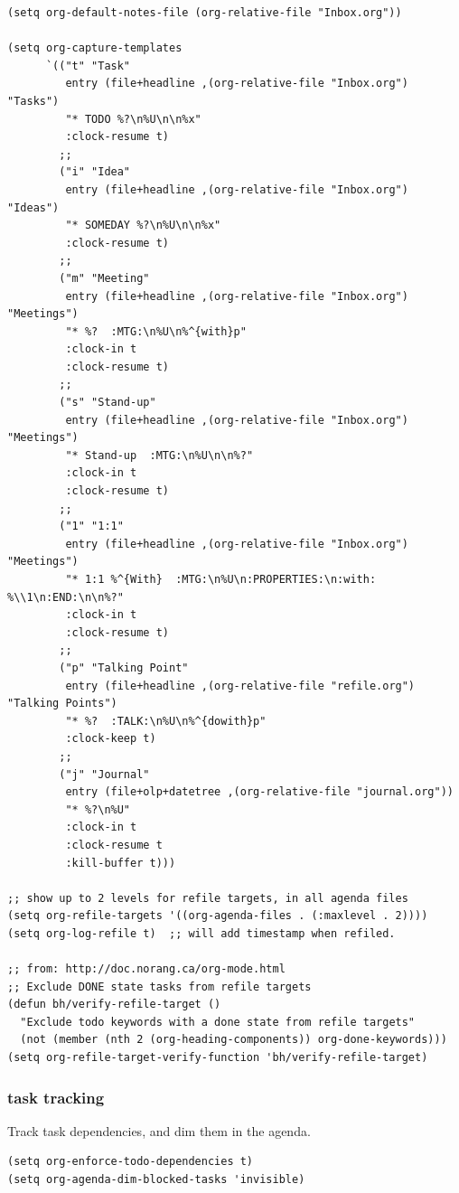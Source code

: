 \documentclass[11pt]{article}
\begin{document}
\begin{verbatim}
(setq org-default-notes-file (org-relative-file "Inbox.org"))

(setq org-capture-templates
      `(("t" "Task"
         entry (file+headline ,(org-relative-file "Inbox.org") "Tasks")
         "* TODO %?\n%U\n\n%x"
         :clock-resume t)
        ;;
        ("i" "Idea"
         entry (file+headline ,(org-relative-file "Inbox.org") "Ideas")
         "* SOMEDAY %?\n%U\n\n%x"
         :clock-resume t)
        ;;
        ("m" "Meeting"
         entry (file+headline ,(org-relative-file "Inbox.org") "Meetings")
         "* %?  :MTG:\n%U\n%^{with}p"
         :clock-in t
         :clock-resume t)
        ;;
        ("s" "Stand-up"
         entry (file+headline ,(org-relative-file "Inbox.org") "Meetings")
         "* Stand-up  :MTG:\n%U\n\n%?"
         :clock-in t
         :clock-resume t)
        ;;
        ("1" "1:1"
         entry (file+headline ,(org-relative-file "Inbox.org") "Meetings")
         "* 1:1 %^{With}  :MTG:\n%U\n:PROPERTIES:\n:with: %\\1\n:END:\n\n%?"
         :clock-in t
         :clock-resume t)
        ;;
        ("p" "Talking Point"
         entry (file+headline ,(org-relative-file "refile.org") "Talking Points")
         "* %?  :TALK:\n%U\n%^{dowith}p"
         :clock-keep t)
        ;;
        ("j" "Journal"
         entry (file+olp+datetree ,(org-relative-file "journal.org"))
         "* %?\n%U"
         :clock-in t
         :clock-resume t
         :kill-buffer t)))

;; show up to 2 levels for refile targets, in all agenda files
(setq org-refile-targets '((org-agenda-files . (:maxlevel . 2))))
(setq org-log-refile t)  ;; will add timestamp when refiled.

;; from: http://doc.norang.ca/org-mode.html
;; Exclude DONE state tasks from refile targets
(defun bh/verify-refile-target ()
  "Exclude todo keywords with a done state from refile targets"
  (not (member (nth 2 (org-heading-components)) org-done-keywords)))
(setq org-refile-target-verify-function 'bh/verify-refile-target)
\end{verbatim}
\subsubsection{task tracking}
\label{sec:org303b0f9}

Track task dependencies, and dim them in the agenda.

\begin{verbatim}
(setq org-enforce-todo-dependencies t)
(setq org-agenda-dim-blocked-tasks 'invisible)
\end{verbatim}
\end{document}
